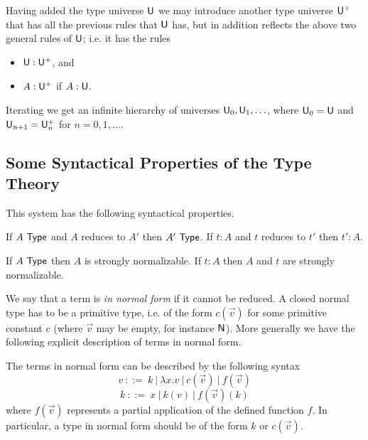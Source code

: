 {Having added the type universe ${\sf U}$ we may introduce another type universe
${\sf U}^+$ that has all the previous rules that ${\sf U}$ has, but in addition reflects the above two general rules of ${\sf U}$; i.e. it has the rules

\medskip

\begin{itemize}
\item ${\sf U}:{\sf U}^+$, and
\item $A:{\sf U}^+$ if $A:{\sf U}$.
\end{itemize}

\medskip

Iterating we get an infinite hierarchy of universes ${\sf U}_0,{\sf U}_1,\ldots$, where
${\sf U}_0={\sf U}$ and ${\sf U}_{n+1}={\sf U}_n^+$ for $n=0,1,\ldots$.

\medskip
\subsection*{Some Syntactical Properties of the Type Theory}
 This system has the following syntactical properties.

\begin{thm}\label{red}
If $A~{\sf Type}$ and $A$ reduces to $A'$ then $A'~{\sf Type}$.
If $t:A$ and $t$ reduces to $t'$ then $t':A$.
\end{thm}

\begin{thm}\label{SN}
 If $A~{\sf Type}$ then $A$ is strongly normalizable.
If $t:A$ then $A$ and $t$ are strongly normalizable. 
\end{thm}

 We say that a term is {\em in normal form} if it cannot be reduced.
A closed normal type has to be a primitive type, i.e. of the form $c(\vec{v})$ for some
primitive constant $c$ (where $\vec{v}$ may be empty, for instance ${\sf N}$). 
More generally we have the following explicit description of terms in normal form.

\begin{lem}\label{normal}
The terms in normal form can be described by the following syntax
$$
v~::=~ k~|~\lambda x.v~|~c(\vec{v})~|~f(\vec{v})
$$
$$
k~::=~x~|~k(v)~|~f(\vec{v})(k)
$$
where $f(\vec{v})$ represents a partial application of the defined function $f$.
In particular, a type in normal form should be of the form $k$ or $c(\vec{v})$.
\end{lem}

}
